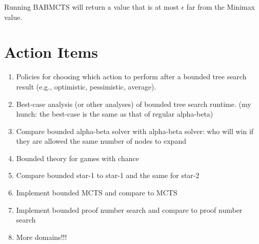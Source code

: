 \begin{theorem}
Running BABMCTS will return a value that is at most $\epsilon$ far from the Minimax value. 
\end{theorem}





\section{Action Items}


\begin{enumerate}
\item Policies for choosing which action to perform after a bounded tree search result
(e.g., optimistic, pessimistic, average).
\item Best-case analysis (or other analyses) of bounded tree search runtime. 
(my hunch: the best-case is the same as that of regular alpha-beta)
\item Compare bounded alpha-beta solver with alpha-beta solver: who will win if they are allowed the same number of nodes to expand
\item Bounded theory for games with chance
\item Compare bounded star-1 to star-1 and the same for star-2
\item Implement bounded MCTS and compare to MCTS
\item Implement bounded proof number search and compare to proof number search
\item More domains!!!
\end{enumerate}

